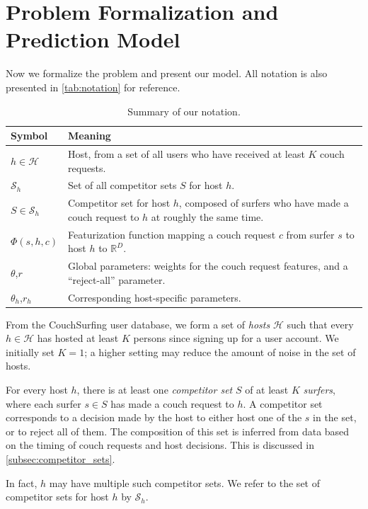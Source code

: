 \section{Problem Formalization and Prediction Model} \label{sec:model}

Now we formalize the problem and present our model.
All notation is also presented in \autoref{tab:notation} for reference.

\begin{table}
\centering
\caption{Summary of our notation.}
\label{tab:notation}
\begin{tabular}{lp{7cm}}
Symbol & Meaning\\
\hline
$h \in \mathcal{H}$   & Host, from a set of all users who have received at least $K$ couch requests. \\ 
$\mathcal{S}_h$       & Set of all competitor sets $S$ for host $h$. \\
$S \in \mathcal{S}_h$ & Competitor set for host $h$, composed of surfers who have made a couch request to $h$ at roughly the same time. \\
$\Phi(s,h,c)$         & Featurization function mapping a couch request $c$ from surfer $s$ to host $h$ to $\mathbb{R}^D.$\\
$\theta$,$r$          & Global parameters: weights for the couch request features, and a ``reject-all'' parameter.\\
$\theta_h$,$r_h$      & Corresponding host-specific parameters.\\
\hline
\end{tabular}\end{table}

From the CouchSurfing user database, we form a set of \emph{hosts} $\mathcal{H}$ such that every $h \in \mathcal{H}$ has hosted at least $K$ persons since signing up for a user account.
We initially set $K=1$; a higher setting may reduce the amount of noise in the set of hosts.

For every host $h$, there is at least one \emph{competitor set} $S$ of at least $K$ \emph{surfers}, where each surfer $s \in S$ has made a couch request to $h$.
A competitor set corresponds to a decision made by the host to either host one of the $s$ in the set, or to reject all of them.
The composition of this set is inferred from data based on the timing of couch requests and host decisions.
This is discussed in \autoref{subsec:competitor_sets}.

In fact, $h$ may have multiple such competitor sets.
We refer to the set of competitor sets for host $h$ by $\mathcal{S}_h$.

